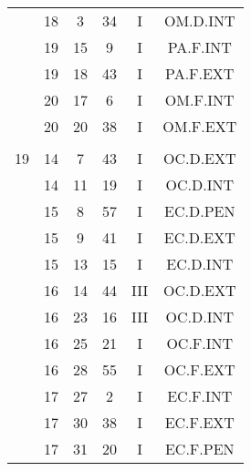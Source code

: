 \documentclass[12pt, a4paper]{article}
\begin{document}
\begin{multicols}{3}
{\begin{tabular}{c c c c c c}
	 	 	 	 & 18 & 3 & 34 & I & OM.D.INT\\%
	 	 	 	 & 19 & 15 & 9 & I & PA.F.INT\\%
	 	 	 	 & 19 & 18 & 43 & I & PA.F.EXT\\%
	 	 	 	 & 20 & 17 & 6 & I & OM.F.INT\\%
	 	 	 	 & 20 & 20 & 38 & I & OM.F.EXT\\%
	 	 	 	 & & & & & \\%
	 	 	 	19 & 14 & 7 & 43 & I & OC.D.EXT\\%
	 	 	 	 & 14 & 11 & 19 & I & OC.D.INT\\%
	 	 	 	 & 15 & 8 & 57 & I & EC.D.PEN\\%
	 	 	 	 & 15 & 9 & 41 & I & EC.D.EXT\\%
	 	 	 	 & 15 & 13 & 15 & I & EC.D.INT\\%
	 	 	 	 & 16 & 14 & 44 & III & OC.D.EXT\\%
	 	 	 	 & 16 & 23 & 16 & III & OC.D.INT\\%
	 	 	 	 & 16 & 25 & 21 & I & OC.F.INT\\%
	 	 	 	 & 16 & 28 & 55 & I & OC.F.EXT\\%
	 	 	 	 & 17 & 27 & 2 & I & EC.F.INT\\%
	 	 	 	 & 17 & 30 & 38 & I & EC.F.EXT\\%
	 	 	 	 & 17 & 31 & 20 & I & EC.F.PEN\\%
	 	 \end{tabular}
 	}
\end{multicols}
\end{document}

